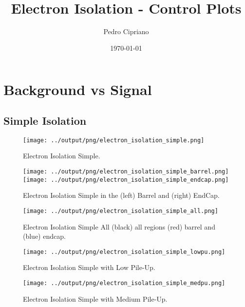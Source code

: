 \documentclass[11pt]{book}
\begin{document}
         
 
 \author{Pedro Cipriano}
 \date{\today}
 \title{Electron Isolation - Control Plots}

\maketitle

\tableofcontents

\chapter{Background vs Signal}

\section{Simple Isolation}

\begin{figure}[htbp]
\centering
\texttt{[image: ../output/png/electron\_isolation\_simple.png]}
\caption{Electron Isolation Simple.}
\label{fig:electron_isolation_simple}
\end{figure}

\begin{figure}[htbp]
\centering
\texttt{[image: ../output/png/electron\_isolation\_simple\_barrel.png]}
\texttt{[image: ../output/png/electron\_isolation\_simple\_endcap.png]}
\caption{Electron Isolation Simple in the (left) Barrel and (right) EndCap.}
\label{fig:electron_isolation_simple_regions}
\end{figure}

\begin{figure}[htbp]
\centering
\texttt{[image: ../output/png/electron\_isolation\_simple\_all.png]}
\caption{Electron Isolation Simple All (black) all regions (red) barrel and (blue) endcap.}
\label{fig:electron_isolation_simple_all}
\end{figure}

\begin{figure}[htbp]
\centering
\texttt{[image: ../output/png/electron\_isolation\_simple\_lowpu.png]}
\caption{Electron Isolation Simple with Low Pile-Up.}
\label{fig:electron_isolation_simple_lowpu}
\end{figure}

\begin{figure}[htbp]
\centering
\texttt{[image: ../output/png/electron\_isolation\_simple\_medpu.png]}
\caption{Electron Isolation Simple with Medium Pile-Up.}
\label{fig:electron_isolation_simple_medpu}
\end{figure}
\end{document}
